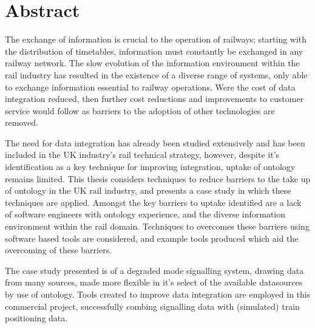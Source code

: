 \begingroup
\let\clearpage\relax
\let\cleardoublepage\relax
\let\cleardoublepage\relax

\chapter*{Abstract}
The exchange of information is crucial to the operation of railways; starting with the distribution of timetables, information must constantly be exchanged in any railway network. The slow evolution of the information environment within the rail industry has resulted in the existence of a diverse range of systems, only able to exchange information essential to railway operations. Were the cost of data integration reduced, then further cost reductions and improvements to customer service would follow as barriers to the adoption of other technologies are removed. 

The need for data integration has already been studied extensively and has been included in the UK industry's rail technical strategy, however, despite it's identification as a key technique for improving integration, uptake of ontology remains limited. This thesis considers techniques to reduce barriers to the take up of ontology in the UK rail industry, and presents a case study in which these techniques are applied. Amongst the key barriers to uptake identified are a lack of software engineers with ontology experience, and the diverse information environment within the rail domain. Techniques to overcomes these barriers using software based tools are considered, and example tools produced which aid the overcoming of these barriers.

The case study presented is of a degraded mode signalling system, drawing data from many sources, made more flexible in it's select of the available datasources by use of ontology. Tools created to improve data integration are employed in this commercial project, successfully combing signalling data with (simulated) train positioning data.


\endgroup			

\vfill